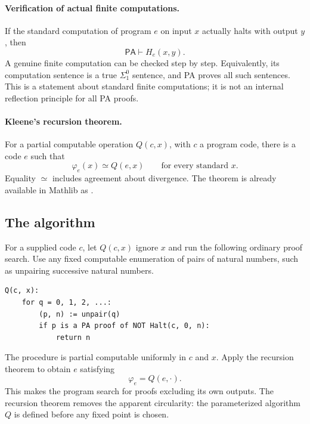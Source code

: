 \documentclass[11pt]{article}
\newcommand{\PA}{\mathsf{PA}}
\theoremstyle{definition}
\theoremstyle{remark}
\begin{document}
\paragraph{Verification of actual finite computations.}
If the standard computation of program $e$ on input $x$ actually halts
with output $y$, then
\begin{equation}\label{eq:finiteverify}
 \PA\vdash H_e(x,y).
\end{equation}
A genuine finite computation can be checked step by step. Equivalently,
its computation sentence is a true $\Sigma^0_1$ sentence, and PA proves
all such sentences. This is a statement about standard finite
computations; it is not an internal reflection principle for all PA
proofs.

\paragraph{Kleene's recursion theorem.}
For a partial computable operation $Q(c,x)$, with $c$ a program code, there
is a code $e$ such that
\begin{equation}\label{eq:fixedpoint}
 \varphi_e(x)\simeq Q(e,x)\qquad\text{for every standard }x.
\end{equation}
Equality $\simeq$ includes agreement about divergence. The theorem is
already available in Mathlib as 
\cite{Mathlib}.

\subsection{The algorithm}

For a supplied code $c$, let $Q(c,x)$ ignore $x$ and run the following
ordinary proof search. Use any fixed computable enumeration of pairs of
natural numbers, such as unpairing successive natural numbers.

\begin{lstlisting}
Q(c, x):
    for q = 0, 1, 2, ...:
        (p, n) := unpair(q)
        if p is a PA proof of NOT Halt(c, 0, n):
            return n
\end{lstlisting}

The procedure is partial computable uniformly in $c$ and $x$. Apply the
recursion theorem to obtain $e$ satisfying
\[
 \varphi_e=Q(e,\cdot).
\]
This makes the program search for proofs excluding its own outputs.
The recursion theorem removes the apparent circularity: the parameterized
algorithm $Q$ is defined before any fixed point is chosen.
\end{document}
